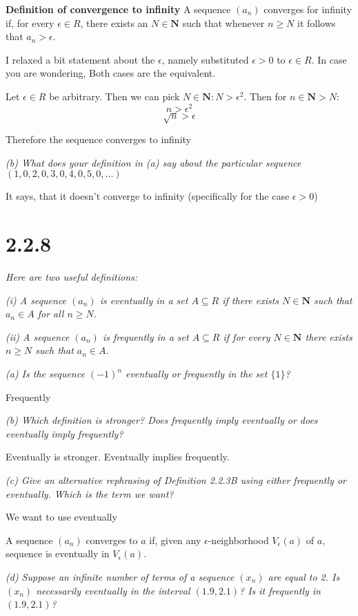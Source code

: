 \documentclass[11pt,oneside,titlepage]{article}
\begin{document}
\textbf{Definition of convergence to infinity}
A sequence $(a_n)$ converges for infinity if, for every $\epsilon \in R$, there exists an
$N \in \textbf{N}$ such that whenever $n \geq N$ it follows that $a_n > \epsilon$.

I relaxed a bit statement about the $\epsilon$, namely substituted $\epsilon > 0$ to
$\epsilon \in R$. In case you are wondering, Both cases are the equivalent.

Let $\epsilon \in R$ be arbitrary. Then we can pick $N \in \textbf{N}: N > \epsilon ^ 2$.
Then for $n \in \textbf{N} > N$:
$$n > \epsilon ^ 2$$
$$\sqrt{n} > \epsilon$$

Therefore the sequence converges to infinity

\textit{(b) What does your definition in (a) say about the particular sequence
  $(1, 0, 2, 0, 3, 0, 4, 0, 5, 0, ...)$}

It says, that it doesn't converge to infinity (specifically for the case $\epsilon > 0$)

\section*{2.2.8}
\textit{Here are two useful definitions:}

\textit{(i) A sequence $(a_n)$ is eventually in a set $A \subseteq R$ if there exists
  $N \in \textbf{N}$ such that $a_n \in A$ for all $n \geq N$.}

\textit{(ii) A sequence $(a_n)$ is frequently in a set $A \subseteq R$ if for every
  $N \in \textbf{N}$ there exists $n \geq N$ such that $a_n \in A$.
}

\textit{(a) Is the sequence $(-1)^n$ eventually or frequently in the set $\{1\}$?}

Frequently

\textit{(b) Which definition is stronger? Does frequently imply eventually or does
  eventually imply frequently?}

Eventually is stronger. Eventually implies frequently.

\textit{(c) Give an alternative rephrasing of Definition 2.2.3B using either frequently
  or eventually. Which is the term we want?}

We want to use eventually

A sequence $(a_n)$ converges to $a$ if, given any $\epsilon$-neighborhood $V_\epsilon(a)$ of
$a$, sequence is eventually in $V_\epsilon(a)$.

\textit{(d) Suppose an infinite number of terms of a sequence $(x_n)$ are equal to 2.
  Is $(x_n)$ necessarily eventually in the interval $(1.9, 2.1)$? Is it frequently in
  $(1.9, 2.1)$?}
\end{document}
